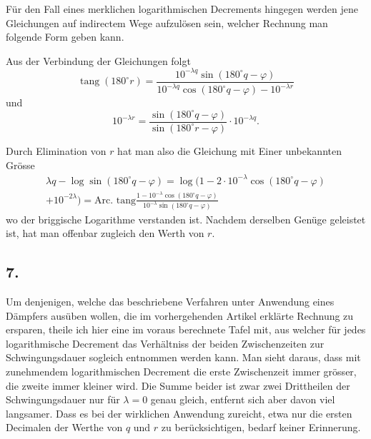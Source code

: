 \documentclass[12pt,a4paper]{article}
\DeclareMathOperator{\tang}{tang}
\begin{document}
Für den Fall eines merklichen logarithmischen Decrements hingegen werden jene Gleichungen auf indirectem Wege aufzulösen sein, welcher Rechnung man folgende Form geben kann.

Aus der Verbindung der Gleichungen folgt
\begin{equation}
\tang(180^{\circ}r) = \frac{10^{-\lambda q}\sin(180^{\circ}q - \varphi)}{10^{-\lambda q}\cos(180^{\circ}q - \varphi) - 10^{-\lambda r}}
\end{equation}
und
\begin{equation}
10^{-\lambda r} = \frac{\sin(180^{\circ}q - \varphi)}{\sin(180^{\circ}r - \varphi)} \cdot 10^{-\lambda q}.
\end{equation}

Durch Elimination von $r$ hat man also die Gleichung mit Einer unbekannten Grösse
\begin{multline}
\lambda q - \log\sin(180^{\circ}q - \varphi) = \log\bigl(1 - 2\cdot 10^{-\lambda}\cos(180^{\circ}q - \varphi)\\
+ 10^{-2\lambda}\bigr) = \text{Arc.\ tang}\frac{1 - 10^{-\lambda}\cos(180^{\circ}q - \varphi)}{10^{-\lambda}\sin(180^{\circ}q - \varphi)}
\end{multline}
wo der briggische Logarithme verstanden ist. Nachdem derselben Genüge geleistet ist, hat man offenbar zugleich den Werth von $r$.

\subsection*{7.}

Um denjenigen, welche das beschriebene Verfahren unter Anwendung eines Dämpfers ausüben wollen, die im vorhergehenden Artikel erklärte Rechnung zu ersparen, theile ich hier eine im voraus berechnete Tafel mit, aus welcher für jedes logarithmische Decrement das Verhältniss der beiden Zwischenzeiten zur Schwingungsdauer sogleich entnommen werden kann. Man sieht daraus, dass mit zunehmendem logarithmischen Decrement die erste Zwischenzeit immer grösser, die zweite immer kleiner wird. Die Summe beider ist zwar zwei Drittheilen der Schwingungsdauer nur für $\lambda = 0$ genau gleich, entfernt sich aber davon viel langsamer. Dass es bei der wirklichen Anwendung zureicht, etwa nur die ersten Decimalen der Werthe von $q$ und $r$ zu berücksichtigen, bedarf keiner Erinnerung.
\end{document}
